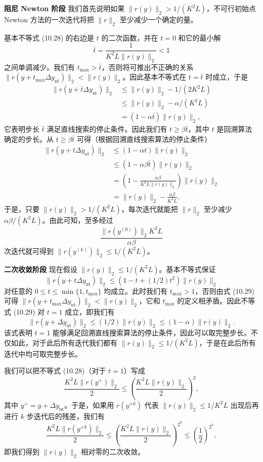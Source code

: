 \documentclass[UTF8,12pt,a4paper,fontset=fandol]{ctexart}
\begin{document}
\noindent\textbf{阻尼 Newton 阶段}\quad
我们首先说明如果 $\|r(y)\|_2>1/(K^2L)$，不可行初始点 Newton 方法的一次迭代将把 $\|r\|_2$ 至少减少一个确定的量。

基本不等式 (10.28) 的右边是 $t$ 的二次函数，并在 $t=0$ 和它的最小解
\[
\bar{t}=\frac{1}{K^2L\|r(y)\|_2}<1
\]
之间单调减少。我们有 $t_{\max}>\bar{t}$，否则将可推出不正确的关系 $\|r(y+t_{\max}\Delta y_{\mathrm{nt}})\|_2<\|r(y)\|_2$。因此基本不等式在 $t=\bar{t}$ 时成立，于是
\[
\begin{aligned}
\|r(y+\bar{t}\Delta y_{\mathrm{nt}})\|_2
&\leq \|r(y)\|_2-1/(2K^2L)\\
&\leq \|r(y)\|_2-\alpha/(K^2L)\\
&=(1-\alpha\bar{t})\|r(y)\|_2,
\end{aligned}
\]
它表明步长 $\bar{t}$ 满足直线搜索的停止条件。因此我们有 $t\geq \beta\bar{t}$，其中 $t$ 是回溯算法确定的步长。从 $t\geq \beta\bar{t}$ 可得（根据回溯直线搜索算法的停止条件）
\[
\begin{aligned}
\|r(y+t\Delta y_{\mathrm{nt}})\|_2
&\leq (1-\alpha t)\|r(y)\|_2\\
&\leq (1-\alpha\beta\bar{t})\|r(y)\|_2\\
&=\left(1-\frac{\alpha\beta}{K^2L\|r(y)\|_2}\right)\|r(y)\|_2\\
&=\|r(y)\|_2-\frac{\alpha\beta}{K^2L}.
\end{aligned}
\]
于是，只要 $\|r(y)\|_2>1/(K^2L)$，每次迭代就能把 $\|r\|_2$ 至少减少 $\alpha\beta/(K^2L)$。由此可知，至多经过
\[
\frac{\|r(y^{(0)})\|_2K^2L}{\alpha\beta}
\]
次迭代就可得到 $\|r(y^{(k)})\|_2\leq 1/(K^2L)$。

\noindent\textbf{二次收敛阶段}\quad
现在假设 $\|r(y)\|_2\leq 1/(K^2L)$。基本不等式保证
\begin{equation}
\|r(y+t\Delta y_{\mathrm{nt}})\|_2
\leq (1-t+(1/2)t^2)\|r(y)\|_2
\tag{10.29}
\end{equation}
对任意的 $0\leq t\leq \min\{1,t_{\max}\}$ 均成立。此时我们有 $t_{\max}>1$，否则由式 (10.29) 可得 $\|r(y+t_{\max}\Delta y_{\mathrm{nt}})\|_2<\|r(y)\|_2$，它和 $t_{\max}$ 的定义相矛盾。因此不等式 (10.29) 对 $t=1$ 成立，即我们有
\[
\|r(y+\Delta y_{\mathrm{nt}})\|_2
\leq (1/2)\|r(y)\|_2
\leq (1-\alpha)\|r(y)\|_2.
\]
该式表明 $t=1$ 能够满足回溯直线搜索算法的停止条件，因此可以取完整步长。不仅如此，对于此后所有迭代我们都有 $\|r(y)\|_2\leq 1/(K^2L)$，于是在此后所有迭代中均可取完整步长。

我们可以把不等式 (10.28)（对于 $t=1$）写成
\[
\frac{K^2L\|r(y^+)\|_2}{2}
\leq
\left(\frac{K^2L\|r(y)\|_2}{2}\right)^2,
\]
其中 $y^+=y+\Delta y_{\mathrm{nt}}$。于是，如果用 $r(y^{+k})$ 代表 $\|r(y)\|_2\leq 1/K^2L$ 出现后再进行 $k$ 步迭代后的残差，我们有
\[
\frac{K^2L\|r(y^{+k})\|_2}{2}
\leq
\left(\frac{K^2L\|r(y)\|_2}{2}\right)^{2^k}
\leq
\left(\frac{1}{2}\right)^{2^k},
\]
即我们得到 $\|r(y)\|_2$ 相对零的二次收敛。
\end{document}
